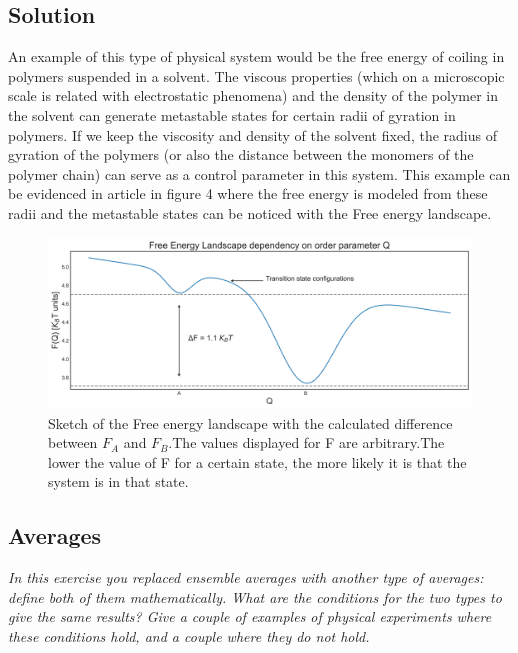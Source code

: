 \documentclass{article}
\begin{document}
\subsection*{Solution}
An example of this type of physical system would be the free energy of coiling in polymers suspended in a solvent. The viscous properties (which on a microscopic scale is related with electrostatic phenomena) and the density of the polymer in the solvent can generate metastable states for certain radii of gyration in polymers. If we keep the viscosity and density of the solvent fixed, the radius of gyration of the polymers (or also the distance between the monomers of the polymer chain) can serve as a control parameter in this system. This example can be evidenced in article \cite{oligom_2014} in figure 4 where  the free energy is modeled from these radii and the metastable states can be noticed with the Free energy landscape.
\begin{figure}[h]
\centering

\includegraphics[width=1\textwidth]{imgs/FEL_Q.png}
\caption{Sketch of the Free energy landscape with the calculated difference between $F_A$ and $F_B$.The values displayed for F are arbitrary.The lower the value of F for a certain state, the more likely it is that the system is in that state.}
\label{img:walks}
\end{figure}
\subsection{Averages}
\textit{In this exercise you replaced ensemble averages with another type of averages: define both of them mathematically. What are the conditions for the two types to give the same results? Give a couple of examples of physical experiments where these conditions hold, and a couple where they do not hold.}
\end{document}

